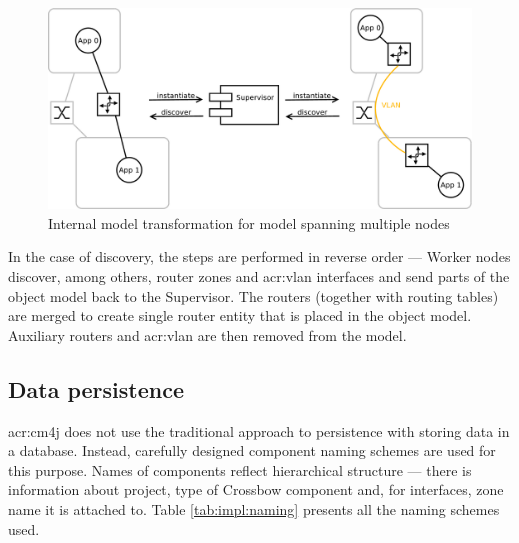 \documentclass[11pt,openany]{book}
\begin{document}
          \begin{figure}[h]
            \centering
            \includegraphics[width=.9\textwidth]{img/test-case/router.pdf}

            \caption{Internal model transformation for model spanning multiple nodes}
            \label{fig:impl:router}
          \end{figure}

          In the case of discovery, the steps are performed in reverse order --- Worker nodes discover, among others,
          router zones and \gls{acr:vlan} interfaces and send parts of the object model back to the Supervisor. The
          routers (together with routing tables) are merged to create single router entity that is placed in the object
          model. Auxiliary routers and \gls{acr:vlan} are then removed from the model.
			
		
      \subsection{Data persistence}
      \label{sec:impl:persist}

        \gls{acr:cm4j} does not use the traditional approach to persistence with storing data in a database. Instead,
        carefully designed component naming schemes are used for this purpose. Names of components reflect hierarchical
        structure --- there is information about project, type of Crossbow component and, for interfaces, zone name it
        is attached to. Table \ref{tab:impl:naming} presents all the naming schemes used.
\end{document}
